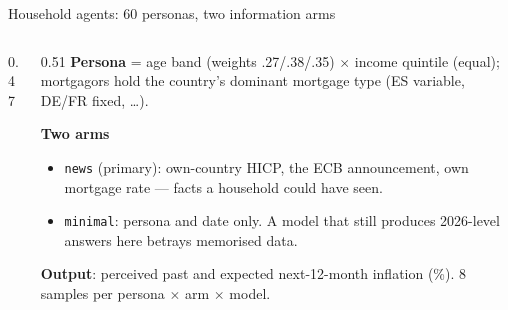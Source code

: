 \documentclass[aspectratio=169,10pt]{beamer}
\begin{document}
\begin{frame}{Household agents: 60 personas, two information arms}
  \begin{columns}[T]
    \begin{column}{0.47\textwidth}
      \centering
    \end{column}
    \begin{column}{0.51\textwidth}
      \footnotesize
      \textbf{Persona} = age band (weights .27/.38/.35) $\times$ income quintile (equal);
      mortgagors hold the country's dominant mortgage type (ES variable, DE/FR fixed, \ldots).

      \vspace{2mm}
      \textbf{Two arms}
      \begin{itemize}
        \item \textcolor{hh}{\texttt{news}} (primary): own-country HICP, the ECB announcement,
              own mortgage rate --- facts a household could have seen.
        \item \texttt{minimal}: persona and date only. A model that still produces 2026-level
              answers here betrays memorised data.
      \end{itemize}

      \textbf{Output}: perceived past and expected next-12-month inflation (\%).
      8 samples per persona $\times$ arm $\times$ model.
    \end{column}
  \end{columns}
\end{frame}
\end{document}
